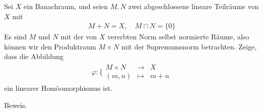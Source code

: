 \begin{exercise}
Sei $X$ ein Banachraum, und seien $M,N$ zwei abgeschlossene lineare Teilräume von $X$ mit
\begin{align*}
  M + N = X, \quad M \cap N = \{0\}
\end{align*}
Es sind $M$ und $N$ mit der von $X$ vererbten Norm selbst normierte Räume, also
können wir den Produktraum $M \times N$ mit der Supremumsnorm betrachten. Zeige,
dass die Abbildung
\begin{align*}
  \varphi: \bigg\{\begin{matrix}
    M \times N &\rightarrow& X \\
    (m,n) &\mapsto& m + n
  \end{matrix}
\end{align*}
ein linearer Homöomorphismus ist.
\end{exercise}
\begin{solution}
Beweis.
\end{solution}
